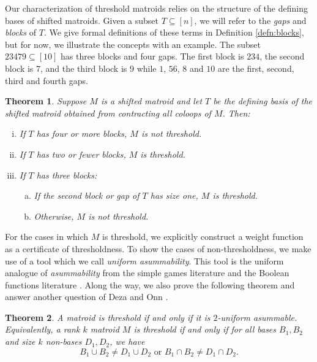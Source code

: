 \documentclass{amsart}
\theoremstyle{definition}
\theoremstyle{plain}
\newtheorem{mainthrm}{Theorem}
\begin{document}
Our characterization of threshold matroids relies on the structure of the defining bases of shifted matroids. Given a subset $T\subseteq [n]$, we will refer to the \emph{gaps} and \emph{blocks} of $T$. We give formal definitions of these terms in Definition \ref{defn:blocks}, but for now, we illustrate the concepts with an example. The subset $23479\subseteq [10]$ has three blocks and four gaps. The first block is $234$, the second block is $7$, and the third block is $9$ while $1$, $56$, $8$ and $10$ are the first, second, third and fourth gaps. 
\begin{mainthrm}
  \label{thrm:main}
Suppose $M$ is a shifted matroid and let $T$ be the defining basis of the shifted matroid obtained from contracting all coloops of $M$.
Then:
\begin{enumerate}[i)]
\item If $T$ has four or more blocks, $M$ is not threshold.
\item If $T$ has two or fewer blocks, $M$ is threshold.
\item If $T$ has three blocks:
\begin{enumerate}[a)]
\item If the second block or gap of $T$ has size one, $M$ is threshold.
\item Otherwise, $M$ is not threshold. 
\end{enumerate}
\end{enumerate}
\end{mainthrm}

For the cases in which $M$ is threshold, we explicitly construct a weight function as a certificate of thresholdness. To show the cases of non-thresholdness, we make use of a tool which we call \emph{uniform asummability}. This tool is the uniform analogue of \emph{asummability} from the simple games literature \cite[Section $2.6$]{TZ} and the Boolean functions literature \cite[Chapter $9$]{Boolean}. Along the way, we also prove the following theorem and answer another question of Deza and Onn \cite[Question $1.1$ of][for matroids]{DO}.

\begin{mainthrm}
  \label{thrm:2-trade}
A matroid is threshold if and only if it is $2$-uniform asummable. Equivalently, a rank $k$ matroid $M$ is threshold if and only if for all bases $B_1,B_2$ and size $k$ non-bases $D_1,D_2$, we have 
\[B_1 \cup B_2 \neq D_1 \cup D_2 \text{ or } B_1\cap B_2 \neq D_1 \cap D_2. \]
\end{mainthrm}
\end{document}
